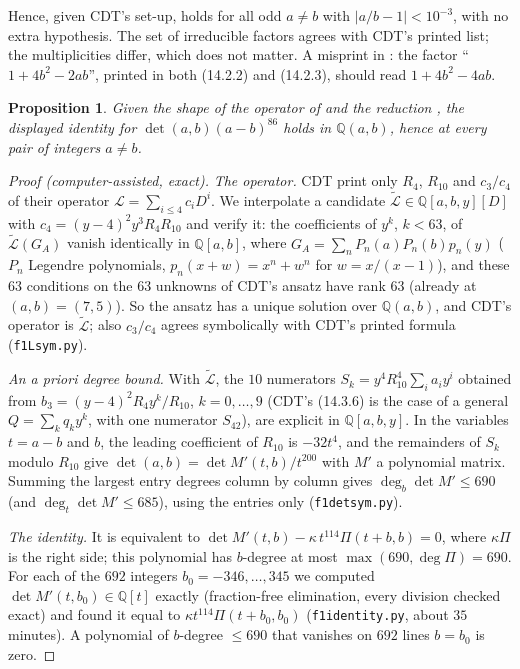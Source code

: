 \documentclass[11pt]{amsart}
\newtheorem{proposition}{Proposition}[section]
\theoremstyle{definition}
\theoremstyle{remark}
\numberwithin{equation}{section}
\newcommand{\QQ}{\mathbb{Q}}
\newcommand{\file}[1]{{\def\_{\textunderscore\allowbreak}\texttt{#1}}}
\begin{document}
Hence, given CDT's set-up, \cite[Lemma~14.3.1]{CDT} holds for all odd $a\ne b$ with $|a/b-1|<10^{-3}$, with no extra
hypothesis. The set of irreducible factors agrees with CDT's printed list; the multiplicities differ, which does not
matter. A misprint in \cite{CDT}: the factor ``$1+4b^2-2ab$'', printed in both (14.2.2) and (14.2.3), should read
$1+4b^2-4ab$.

\begin{proposition}\label{prop:detid}
Given the shape \cite[(14.2.1)]{CDT} of the operator of \cite[Prop.~14.1.11]{CDT} and the reduction
\cite[(14.3.2)--(14.3.5)]{CDT}, the displayed identity for $\det(a,b)(a-b)^{86}$ holds in $\QQ(a,b)$, hence at every
pair of integers $a\ne b$.
\end{proposition}

\begin{proof}[Proof (computer-assisted, exact)]
\emph{The operator.} CDT print only $R_4$, $R_{10}$ and $c_3/c_4$ of their operator $\mathcal L=\sum_{i\le4}c_iD^i$. We
interpolate a candidate $\tilde{\mathcal L}\in\QQ[a,b,y][D]$ with $c_4=(y-4)^2y^3R_4R_{10}$ and verify it: the
coefficients of $y^k$, $k<63$, of $\tilde{\mathcal L}(G_A)$ vanish identically in $\QQ[a,b]$, where
$G_A=\sum_nP_n(a)P_n(b)p_n(y)$ ($P_n$ Legendre polynomials, $p_n(x+w)=x^n+w^n$ for $w=x/(x-1)$), and these $63$
conditions on the $63$ unknowns of CDT's ansatz have rank $63$ (already at $(a,b)=(7,5)$). So the ansatz has a unique
solution over $\QQ(a,b)$, and CDT's operator is $\tilde{\mathcal L}$; also $c_3/c_4$ agrees symbolically with CDT's
printed formula (\file{f1\_Lsym.py}).

\emph{An a priori degree bound.} With $\tilde{\mathcal L}$, the $10$ numerators $S_k=y^4R_{10}^4\sum_ia_iy^i$ obtained
from $b_3=(y-4)^2R_4y^k/R_{10}$, $k=0,\dots,9$ (CDT's (14.3.6) is the case of a general $Q=\sum_kq_ky^k$, with one
numerator $S_{42}$), are explicit in $\QQ[a,b,y]$. In the variables $t=a-b$ and $b$, the leading coefficient of $R_{10}$ is $-32t^4$, and the
remainders of $S_k$ modulo $R_{10}$ give $\det(a,b)=\det M'(t,b)/t^{200}$ with $M'$ a polynomial matrix. Summing the
largest entry degrees column by column gives $\deg_b\det M'\le690$ (and $\deg_t\det M'\le685$), using the entries only
(\file{f1\_detsym.py}).

\emph{The identity.} It is equivalent to $\det M'(t,b)-\kappa\,t^{114}\Pi(t+b,b)=0$, where $\kappa\Pi$ is the right
side; this polynomial has $b$-degree at most $\max(690,\deg\Pi)=690$. For each of the $692$ integers
$b_0=-346,\dots,345$ we computed $\det M'(t,b_0)\in\QQ[t]$ exactly (fraction-free elimination, every division checked
exact) and found it equal to $\kappa t^{114}\Pi(t+b_0,b_0)$ (\file{f1\_identity.py}, about $35$ minutes). A polynomial of
$b$-degree $\le690$ that vanishes on $692$ lines $b=b_0$ is zero.
\end{proof}
\end{document}
